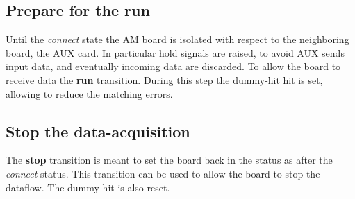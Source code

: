 \subsection{Prepare for the run}

Until the \emph{connect} state the AM board is isolated with respect
to the neighboring board, the AUX card. In particular hold signals are raised,
to avoid AUX sends input data, and eventually incoming data are discarded.
 To allow the board to receive data the
\textbf{run} transition. During this step the dummy-hit hit is set, allowing
to reduce the matching errors.

\subsection{Stop the data-acquisition}

The \textbf{stop} transition is meant 
to set the board back in the status as after
the \emph{connect} status. This transition can be used to allow the board
to stop the dataflow. The dummy-hit is also reset.
